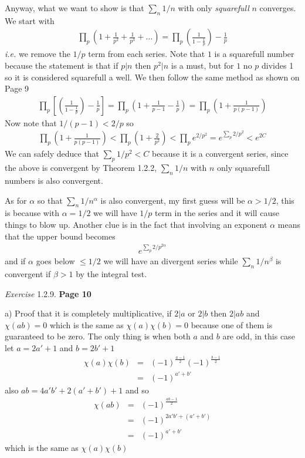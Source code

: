 \documentclass[aps,preprint,preprintnumbers,nofootinbib,showpacs,prd]{revtex4-1}
\newcommand{\ie}{{\it i.e.} }
\newcommand{\nbea}{\begin{eqnarray*}}
\newcommand{\neea}{\end{eqnarray*}}
\begin{document}
Anyway, what we want to show is that $\sum_n 1/n$ with only {\it squarefull} $n$ converges. We start with
%
\nbea
\prod_p \left( 1 + \frac{1}{p^2} + \frac{1}{p^3} + \dots\right ) = \prod_p \left (\frac{1}{1 - \frac{1}{p}} \right ) - \frac{1}{p}
\neea
%
\ie we remove the $1/p$ term from each series. Note that $1$ is a squarefull number because the statement is that if $p|n$ then $p^2|n$ is a must, but for $1$ no $p$ divides 1 so it is considered squarefull a well. We then follow the same method as shown on Page 9
%
\nbea
\prod_p \left\lbrack\left (\frac{1}{1 - \frac{1}{p}} \right ) - \frac{1}{p}\right\rbrack = \prod_p \left ( 1 + \frac{1}{p-1} - \frac{1}{p} \right ) = \prod_p \left( 1 + \frac{1}{p(p-1)}\right )
\neea
%
Now note that $1/(p-1) < 2/p$ so
%
\nbea
\prod_p \left( 1 + \frac{1}{p(p-1)}\right ) < \prod_p \left( 1 + \frac{2}{p^2}\right ) < \prod_p e^{2/p^2} = e^{\sum_{p} 2/p^2} < e^{2C}
\neea
%
We can safely deduce that $\sum_p 1/p^2 < C$ because it is a convergent series, since the above is convergent by Theorem 1.2.2, $\sum_n 1/n$ with $n$ only squarefull numbers is also convergent.

As for $\alpha$ so that $\sum_n 1/n^\alpha$ is also convergent, my first guess will be $\alpha > 1/2$, this is because with $\alpha = 1/2$ we will have $1/p$ term in the series and it will cause things to blow up. Another clue is in the fact that involving an exponent $\alpha$ means that the upper bound becomes
%
\nbea
e^{\sum_{p} 2/p^{2\alpha}}
\neea
%
and if $\alpha$ goes below $\le 1/2$ we will have an divergent series while $\sum_n 1/n^\beta$ is convergent if $\beta > 1$ by the integral test.

{\it Exercise} 1.2.9. {\bf Page 10}

a) Proof that it is completely multiplicative, if $2|a$ or $2|b$ then $2|ab$ and $\chi(ab) = 0$ which is the same as $\chi(a)\chi(b) = 0$ because one of them is guaranteed to be zero. The only thing is when both $a$ and $b$ are odd, in this case let $a = 2a' + 1$ and $b = 2b' + 1$
%
\nbea
\chi(a)\chi(b) & = & (-1)^{\frac{a - 1}{2}}(-1)^{\frac{b - 1}{2}} \\
& = & (-1)^{a' + b'}
\neea
%
also $ab = 4a'b' + 2(a' + b') + 1$ and so
%
\nbea
\chi(ab) & = & (-1)^{\frac{ab - 1}{2}} \\
& = & (-1)^{2a'b' + (a' + b')} \\
& = & (-1)^{a' + b'}
\neea
%
which is the same as $\chi(a)\chi(b)$
\end{document}

